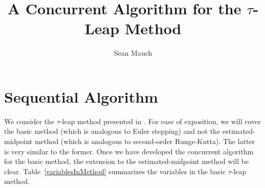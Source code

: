 \documentclass[letterpaper]{article}
\title{A Concurrent Algorithm for the $\tau$-Leap Method}
\author{Sean Mauch}
\begin{document}
\maketitle


\section{Sequential Algorithm}


We consider the $\tau$-leap method presented in \cite{gillespie}.  For 
ease of exposition, we will cover the basic method 
(which is analogous to Euler stepping) and not the estimated-midpoint
method (which is analogous to second-order Runge-Kutta).  The latter is
very similar to the former.  Once we have developed the concurrent 
algorithm for the basic method, the extension to the 
estimated-midpoint method will be clear.
Table~\ref{variablesInMethod} summarizes the variables in the 
basic $\tau$-leap method.
\end{document}
